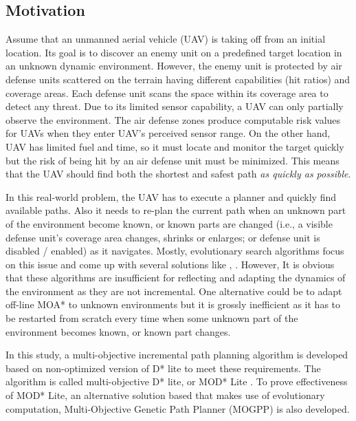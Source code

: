 \documentclass[10pt,journal]{IEEEtran}
\begin{document}
\subsection{Motivation}
Assume that an unmanned aerial vehicle (UAV) is taking off from an initial location. Its goal is to discover an enemy unit on a predefined target location in an unknown dynamic environment. However, the enemy unit is protected by air defense units scattered on the terrain having different capabilities (hit ratios) and coverage areas. Each defense unit scans the space within its coverage area to detect any threat. Due to its limited sensor capability, a UAV can only partially observe the environment. The air defense zones produce computable risk values for UAVs when they enter UAV's perceived sensor range. On the other hand, UAV has limited fuel and time, so it must locate and monitor the target quickly but the risk of being hit by an air defense unit must be minimized. This means that the UAV should find both the shortest and safest path \textit{as quickly as possible}.

In this real-world problem, the UAV has to execute a planner and quickly find available paths. Also it needs to re-plan the current path when an unknown part of the environment become known, or known parts are changed (i.e., a visible defense unit's coverage area changes, shrinks or enlarges; or defense unit is disabled / enabled) as it navigates. Mostly, evolutionary search algorithms focus on this issue and come up with several solutions like \cite{Peng_Xu_Zhang:2011}, \cite{Foo_Knutzon:2009}. However, It is obvious that these algorithms are insufficient for reflecting and adapting the dynamics of the environment as they are not incremental. One alternative could be to adapt off-line MOA* to unknown environments but it is grossly inefficient as it has to be restarted from scratch every time when some unknown part of the environment becomes known, or known part changes.

In this study, a multi-objective incremental path planning algorithm is developed based on non-optimized version of D* lite \cite{Koenig:2002} to meet these requirements. The algorithm is called multi-objective D* lite, or MOD* Lite \cite{Oral:2012}. To prove effectiveness of MOD* Lite,  an alternative solution based that makes use of evolutionary computation, Multi-Objective Genetic Path Planner (MOGPP) is also developed. 
\end{document}
